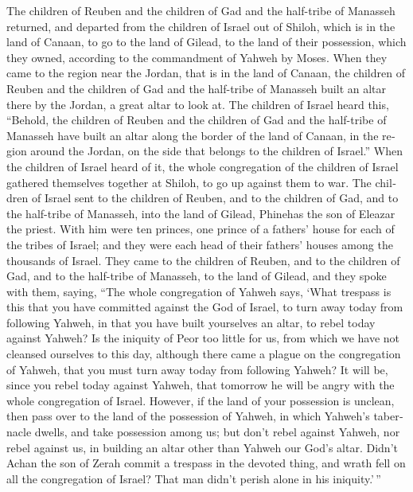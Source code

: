 \begin{paracol}{2}
\begin{otherlanguage}{english}
 The children of Reuben and the children of Gad and the
half-tribe of Manasseh returned, and departed from the children of
Israel out of Shiloh, which is in the land of Canaan, to go to the land
of Gilead, to the land of their possession, which they owned, according
to the commandment of Yahweh by Moses.  When they came to
the region near the Jordan, that is in the land of Canaan, the children
of Reuben and the children of Gad and the half-tribe of Manasseh built
an altar there by the Jordan, a great altar to look at. 
The children of Israel heard this, ``Behold, the children of Reuben and
the children of Gad and the half-tribe of Manasseh have built an altar
along the border of the land of Canaan, in the region around the Jordan,
on the side that belongs to the children of Israel.'' 
When the children of Israel heard of it, the whole congregation of the
children of Israel gathered themselves together at Shiloh, to go up
against them to war.  The children of Israel sent to the
children of Reuben, and to the children of Gad, and to the half-tribe of
Manasseh, into the land of Gilead, Phinehas the son of Eleazar the
priest.  With him were ten princes, one prince of a
fathers' house for each of the tribes of Israel; and they were each head
of their fathers' houses among the thousands of Israel. 
They came to the children of Reuben, and to the children of Gad, and to
the half-tribe of Manasseh, to the land of Gilead, and they spoke with
them, saying,  ``The whole congregation of Yahweh says,
`What trespass is this that you have committed against the God of
Israel, to turn away today from following Yahweh, in that you have built
yourselves an altar, to rebel today against Yahweh?  Is
the iniquity of Peor too little for us, from which we have not cleansed
ourselves to this day, although there came a plague on the congregation
of Yahweh,  that you must turn away today from following
Yahweh? It will be, since you rebel today against Yahweh, that tomorrow
he will be angry with the whole congregation of Israel. 
However, if the land of your possession is unclean, then pass over to
the land of the possession of Yahweh, in which Yahweh's tabernacle
dwells, and take possession among us; but don't rebel against Yahweh,
nor rebel against us, in building an altar other than Yahweh our God's
altar.  Didn't Achan the son of Zerah commit a trespass
in the devoted thing, and wrath fell on all the congregation of Israel?
That man didn't perish alone in his iniquity.'\,''


\end{otherlanguage}
\end{paracol}
